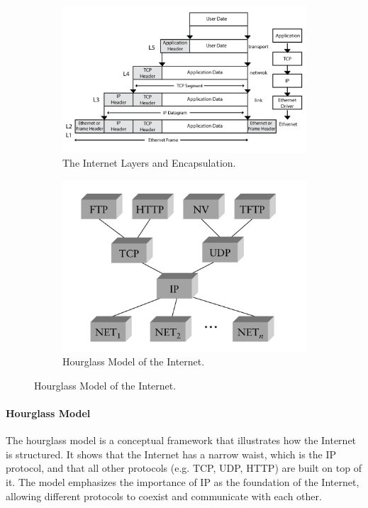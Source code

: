 \documentclass[openany,12pt]{book}
\begin{document}
\begin{figure}[H]
    \centering
    \begin{subfigure}[b]{0.5\textwidth}
        \centering
        \includegraphics[width=\textwidth]{network-layers.png}
        \caption{The Internet Layers and Encapsulation.}
        \label{fig:network-layers}
    \end{subfigure}
    \hfill %
    \begin{subfigure}[b]{0.4\textwidth}
        \centering
        \includegraphics[width=\textwidth]{hourglass.png}
        \caption{Hourglass Model of the Internet.}
        \label{fig:hourglass}
    \end{subfigure}
\end{figure}

\paragraph{Hourglass Model} The hourglass model is a conceptual framework that illustrates how the Internet is structured. It shows that the Internet has a narrow waist, which is the IP protocol, and that all other protocols (e.g. TCP, UDP, HTTP) are built on top of it. The model emphasizes the importance of IP as the foundation of the Internet, allowing different protocols to coexist and communicate with each other.
\end{document}
